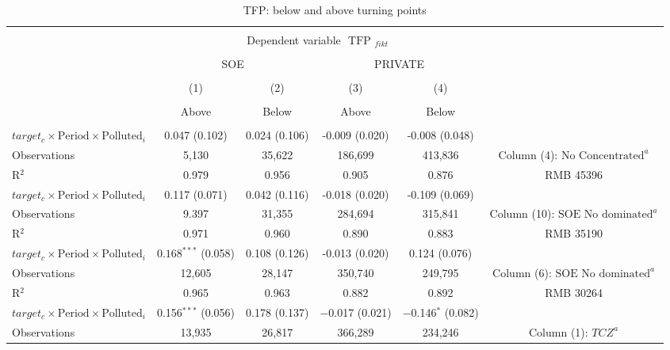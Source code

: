 \documentclass[12pt]{article}
\begin{document}
\begin{table}[!htb] \centering 
  \caption{\\ TFP: below and above turning points} 
\label{table_11}
\begin{adjustbox}{width=\textwidth, totalheight=\baselineskip,keepaspectratio}
\begin{tabular}{@{\extracolsep{5pt}}lccccc} 
\\[-1.8ex]\hline 
\hline \\[-1.8ex] 
 & \multicolumn{4}{c}{Dependent variable $\text { TFP }_{fikt}$} \\ 
\cline{2-6}
            
\\[-1.8ex]
            &\multicolumn{2}{c}{SOE}&\multicolumn{2}{c}{PRIVATE}\\
\\[-1.8ex] & (1) & (2) & (3) & (4) \\
 \\[-1.8ex]& Above & Below & Above & Below \\
 \hline \\[-1.8ex] 
$target_c \times \text{Period} \times \text{Polluted}_i$  &0.047 (0.102) & 0.024 (0.106) & -0.009 (0.020)& -0.008 (0.048) &  \\
Observations  & 5,130 & 35,622 & 186,699 & 413,836&  Column (4): $\text{No Concentrated}^a$\\
R$^{2}$  & 0.979&0.956&0.905&0.876&  RMB 45396\\
\hline 
$target_c \times \text{Period} \times \text{Polluted}_i$  &  0.117 (0.071) & 0.042 (0.116) & -0.018 (0.020) & -0.109 (0.069)&  \\
Observations  & 9.397&31,355 & 284,694 & 315,841 &  Column (10): $\text{SOE No dominated}^a$ \\ 
R$^{2}$  &0.971&0.960&0.890&0.883&  RMB 35190\\
\hline 
$target_c \times \text{Period} \times \text{Polluted}_i$  &  $0.168^{***}$  (0.058) & 0.108 (0.126)  &-0.013 (0.020) & 0.124 (0.076)& \\
Observations  & 12,605 & 28,147 & 350,740 & 249,795 &  Column (6): $\text{SOE No dominated}^a$ \\ 
R$^{2}$  & 0.965&0.963&0.882&0.892 &  RMB 30264\\
\hline 
$target_c \times \text{Period} \times \text{Polluted}_i$  & 
0.156$^{***}$ (0.056)& 0.178 (0.137)& $-$0.017  (0.021)& $-$0.146$^{*}$ (0.082) & \\
Observations  & 13,935 & 26,817 & 366,289 & 234,246 & Column (1): $TCZ^a$\\ 

\end{tabular}
\end{adjustbox}
\end{table}
\end{document}
